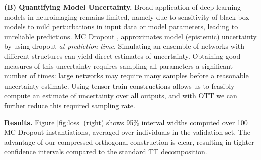 \textbf{(B) Quantifying Model Uncertainty.}
Broad application of deep learning models in neuroimaging remains limited, namely due to sensitivity of black box models to mild perturbations in input data or model parameters, leading to unreliable predictions.
MC Dropout \citep{gal2016dropout}, approximates model (epistemic) uncertainty by using dropout \textit{at prediction time}. Simulating an ensemble of networks with different structures can yield direct estimates of uncertainty.
Obtaining good measures of this uncertainty requires sampling all parameters a significant number of times: large networks may require many samples before a reasonable uncertainty estimate.
Using tensor train constructions allows us to feasibly compute an estimate of uncertainty over all outputs, and with OTT we can further reduce this required sampling rate.

\textbf{Results.} Figure \ref{fig:loss} (right)
shows
95\% interval widths computed over 100 MC Dropout instantiations, averaged over individuals in the validation set. The advantage of our compressed orthogonal construction is clear, resulting in tighter confidence intervals compared to the standard TT decomposition. 




